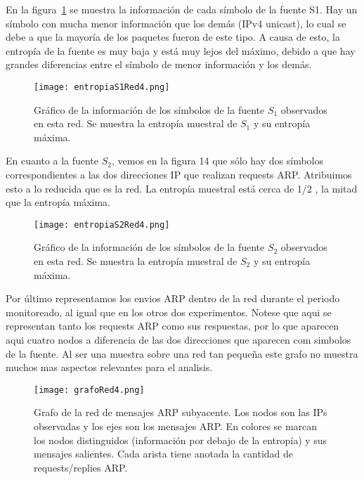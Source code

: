 En la figura~\ref{entropias1_4} se muestra la información de cada símbolo de la fuente S1. 
Hay un símbolo con mucha menor información que los demás (IPv4 unicast), lo cual se debe a que la mayoría de los paquetes fueron de este tipo. 
A causa de esto, la entropía de la fuente es muy baja y está muy lejos del máximo, debido a que hay grandes diferencias entre el símbolo de menor información y los demás.

\begin{figure}[H]
\centering
\texttt{[image: entropiaS1Red4.png]}
\caption{Gráfico de la información de los símbolos de la fuente $S_1$ observados en esta red. Se muestra la entropía muestral de $S_1$ y su entropía máxima.}
\label{entropias1_4}
\end{figure}

En cuanto a la fuente $S_2$, vemos en la figura 14 que sólo hay dos símbolos correspondientes a las dos direcciones IP que realizan requests ARP. Atribuimos esto a lo reducida que es la red. 
La entropía muestral está cerca de 1/2 , la mitad que la entropía máxima.

\begin{figure}[H]
\centering
\texttt{[image: entropiaS2Red4.png]}
\caption{Gráfico de la información de los símbolos de la fuente $S_2$ observados en esta red. Se muestra la entropía muestral de $S_2$ y su entropía máxima.}
\label{entropias2_4}
\end{figure}

Por último representamos los envios ARP dentro de la red durante el periodo monitoreado, al igual que en los otros dos experimentos. 
Notese que aqui se representan tanto los requests ARP como sus respuestas, por lo que aparecen aqui cuatro nodos a diferencia de las dos direcciones que aparecen com simbolos de la fuente. 
Al ser una muestra sobre una red tan pequeña este grafo no muestra muchos mas aspectos relevantes para el analisis.

\begin{figure}[H]
\centering
\texttt{[image: grafoRed4.png]}
\caption{Grafo de la red de mensajes ARP subyacente. Los nodos son las IPs observadas y los ejes son los mensajes ARP. En colores se marcan los nodos distinguidos (información por debajo de la entropía) y sus mensajes salientes. Cada arista tiene anotada la cantidad de requests/replies ARP.}
\label{grafo4}
\end{figure}